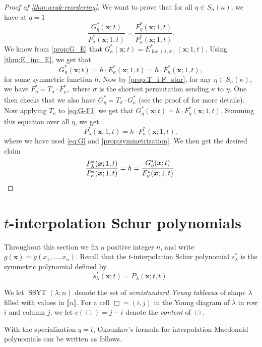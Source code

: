 \documentclass[12pt]{amsart}
\theoremstyle{definition}
\newcommand{\bfx}{\boldsymbol{x}}
\DeclareMathOperator{\inc}{inc}
\DeclareMathOperator{\SSYT}{SSYT}
\begin{document}
\begin{appendices}
\begin{proof}[Proof of \cref{thm:weak-reordering}]
We want to prove that for all $\eta\in S_n(\kappa)$, we have at $q=1$
    $$\frac{G^*_\eta(\bfx;t)}{P^*_\lambda(\bfx;1,t)}=\frac{F^*_\eta(\bfx;1,t)}{P^*_\kappa(\bfx;1,t)}.$$
    We know from \cref{prop:G_E} that $G_\kappa^*(\bfx;t)=E^*_{\inc(\lambda,\phi)}(\bfx;1,t)$. Using \cref{thm:E_inc_E}, we get that 
    \begin{equation}\label{eq:G-F1}
      G_\kappa^*(\bfx;t)
      =h\cdotp E_\kappa^*(\bfx;1,t)
      =h\cdotp F_\kappa^*(\bfx;1,t),  
    \end{equation}
    for some symmetric function $h$.
    Now by \cref{prop:T_i-F_star}, for any
    $\eta \in S_n(\kappa)$, we have $F^*_\eta=T_\sigma \cdotp F_\kappa^*,$
    where $\sigma$ is the shortest permutation sending $\kappa$ to $\eta$. One then checks that we also have $G^*_\eta=T_\sigma \cdotp G_\kappa^*$ (see the proof of \cite[Lemma 4.12]{AyyerMartinWilliams2025} for more details).
    Now applying $T_\sigma$ to \cref{eq:G-F1} we get that 
    $ G_\eta^*(\bfx;t)=h\cdotp F_\eta^*(\bfx;1,t).$
    Summing this equation over all $\eta$, we get
    $$P_\lambda^*(\bfx;1,t)=h\cdotp P_\kappa^*(\bfx;1,t),$$
    where we have used \cref{eq:G} and \cref{prop:symmetrization}. We then get the desired claim
    \begin{equation*}
    \frac{P_\lambda^*(\bfx;1,t)}{P_\kappa^*(\bfx;1,t)}=h=\frac{G_\eta^*(\bfx;t)}{F_\eta^*(\bfx;1,t)}.\qedhere    
    \end{equation*}
\end{proof}


\section{\texorpdfstring{$t$}{t}-interpolation Schur polynomials}\label{app:t_int_Schur}
Throughout this section we fix a positive integer $n$,
and write 
$g(\bfx)=g(x_1,\dots,x_n)$.
Recall that the $t$-interpolation Schur polynomial $s_\lambda^*$ is the symmetric polynomial defined by
    $$s^*_\lambda(\bfx;t)=P_\lambda(\bfx;t,t).$$


We let $\SSYT(\lambda;n)$ denote the set of \emph{semistandard Young tableaux} of shape $\lambda$ filled with values in $\llbracket n\rrbracket$. For a cell $\Box=(i,j)$ in the Young diagram of $\lambda$ in  row $i$ and column $j$, we let $c(\Box)=j-i$ denote the \emph{content} of $\Box$.

With the specialization $q=t$, Okounkov's formula for interpolation Macdonald polynomials \cite[Equation (1.4)]{Okounkov1998} can be written as follows.


\end{appendices}
\end{document}
